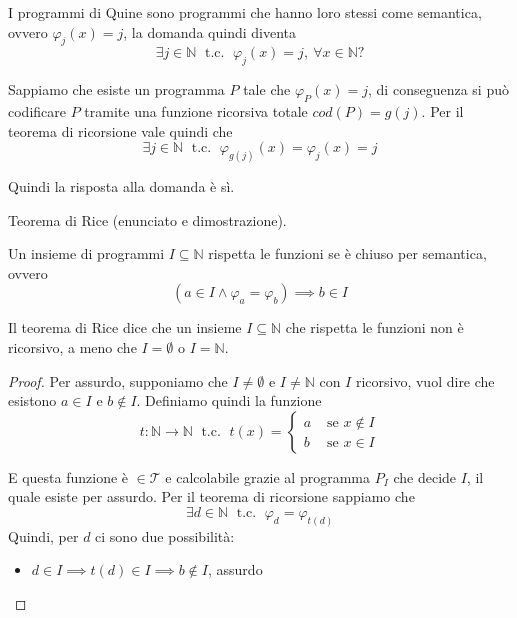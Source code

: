 \documentclass[12pt, answers]{exam}
\theoremstyle{plain}
\newcommand{\tc}{\; \text{ t.c. } \;}
\newcommand{\T}{\mathcal{T}}
\newcommand{\N}{\mathbb{N}}
\begin{document}
\begin{questions}
        \begin{solution}
            I programmi di Quine sono programmi che hanno loro stessi come semantica, ovvero $\varphi_j (x) = j$, la domanda quindi diventa
            $$ \exists j \in \N \tc \varphi_j (x) = j, \ \forall x \in \N? $$
            
            Sappiamo che esiste un programma $P$ tale che $\varphi_P (x) = j$, di conseguenza si può codificare $P$ tramite una funzione ricorsiva totale $cod(P) = g(j)$. Per il teorema di ricorsione vale quindi che 
            $$\exists j \in \N \tc \varphi_{g(j)} (x)  = \varphi_j (x) = j $$
            
            Quindi la risposta alla domanda è sì.
        \end{solution}
        
        \question Teorema di Rice (enunciato e dimostrazione).
        
        \begin{solution}
            Un insieme di programmi $I \subseteq \N$ rispetta le funzioni se è chiuso per semantica, ovvero
            $$ (a \in I \wedge \varphi_a = \varphi_b) \implies b \in I $$
            
            Il teorema di Rice dice che un insieme $I \subseteq \N$ che rispetta le funzioni non è ricorsivo, a meno che $I = \emptyset$ o $I = \N$.
            
            \begin{proof}
                Per assurdo, supponiamo che $I \neq \emptyset$ e $I \neq \N$ con $I$ ricorsivo, vuol dire che esistono $a \in I$ e $b \notin I$. Definiamo quindi la funzione
                $$ t:\N \rightarrow \N \tc t(x) = \begin{cases}
                    a & \text{ se } x \notin I \\
                    b & \text{ se } x \in I 
                \end{cases} $$
                
                E questa funzione è $\in \T$ e calcolabile grazie al programma $P_I$ che decide $I$, il quale esiste per assurdo. Per il teorema di ricorsione sappiamo che
                $$ \exists d \in \N \tc \varphi_d = \varphi_{t(d)} $$
                Quindi, per $d$ ci sono due possibilità:
                \begin{itemize}
                    \item $d \in I \implies t(d) \in I \implies b \notin I$, assurdo
                    

\end{itemize}
\end{proof}
\end{solution}
\end{questions}
\end{document}
